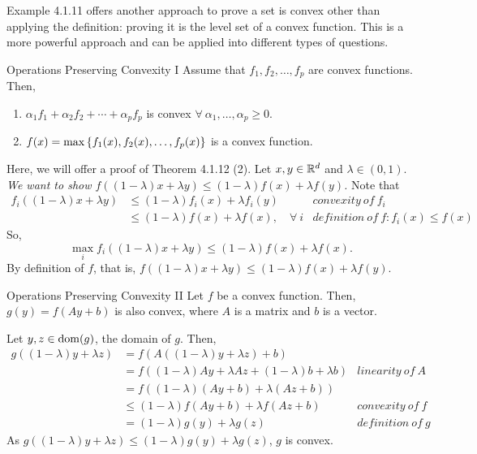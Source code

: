 \begin{rmk}
	Example 4.1.11 offers another approach to prove a set is convex other than applying the definition: proving it is the level set of a convex function. This is a more powerful approach and can be applied into different types of questions.
\end{rmk}
\begin{thm}{Operations Preserving Convexity I}
	Assume that $f_1,f_2,\dots,f_p$ are convex functions. Then, 
	\begin{enumerate}
		\item $\alpha_1f_1+\alpha_2f_2+\cdots+\alpha_pf_p$ is convex $\forall\ \alpha_1,\dots,\alpha_p\geq0$.
		\item $f(x)=\max\qty{f_1(x),f_2(x),\dots,f_p(x)}$ is a convex function.
	\end{enumerate}	
\end{thm}
\begin{prf}
	Here, we will offer a proof of Theorem 4.1.12 (2). Let $x,y\in{\mathbb{R}}^d$ and $\lambda\in(0,1)$. \textit{We want to show $f((1-\lambda)x+\lambda y)\leq(1-\lambda)f(x)+\lambda f(y)$.} Note that \begin{align*}f_i((1-\lambda)x+\lambda y)&\leq(1-\lambda)f_i(x)+\lambda f_i(y)&convexity\ of\ f_i\\&\leq(1-\lambda)f(x)+\lambda f(x),\quad\forall\ i&definition\ of\ f: f_i(x)\leq f(x)\end{align*} So, \[\max_if_i((1-\lambda)x+\lambda y)\leq(1-\lambda)f(x)+\lambda f(x).\] By definition of $f$, that is, $f((1-\lambda)x+\lambda y)\leq(1-\lambda)f(x)+\lambda f(y)$.
\end{prf}
\begin{thm}{Operations Preserving Convexity II}
	Let $f$ be a convex function. Then, $g(y)=f(Ay+b)$ is also convex, where $A$ is a matrix and $b$ is a vector. 	
\end{thm}
\begin{prf}
	Let $y,z\in\operatorname{dom}(g)$, the domain of $g$. Then, \begin{align*}g((1-\lambda)y+\lambda z)&=f(A((1-\lambda)y+\lambda z)+b)\\&=f((1-\lambda)Ay+\lambda Az+(1-\lambda)b+\lambda b)&linearity\ of\ A\\&=f((1-\lambda)(Ay+b)+\lambda(Az+b))\\&\leq(1-\lambda)f(Ay+b)+\lambda f(Az+b)&convexity\ of\ f\\&=(1-\lambda)g(y)+\lambda g(z)&definition\ of\ g\end{align*} As $g((1-\lambda)y+\lambda z)\leq(1-\lambda)g(y)+\lambda g(z)$, $g$ is convex. 
\end{prf}
